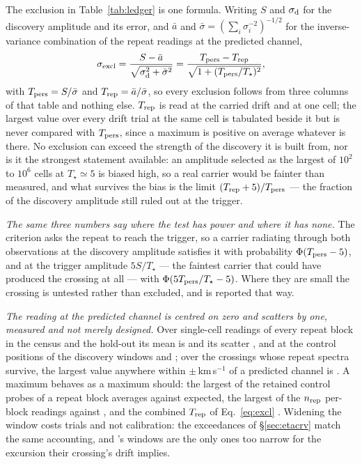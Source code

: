 The exclusion in Table~\ref{tab:ledger} is one formula. Writing $S$ and
$\sigma_{\rm d}$ for the discovery amplitude and its error, and $\bar{a}$ and
$\bar{\sigma}=(\sum_i\sigma_i^{-2})^{-1/2}$ for the inverse-variance
combination of the repeat readings at the predicted channel,
\begin{equation}
\sigma_{\rm excl}=\frac{S-\bar{a}}
{\sqrt{\sigma_{\rm d}^{2}+\bar{\sigma}^{2}}}
=\frac{T_{\rm pers}-T_{\rm rep}}{\sqrt{1+(T_{\rm pers}/T_\star)^{2}}},
\label{eq:excl}
\end{equation}
with $T_{\rm pers}=S/\bar{\sigma}$ and $T_{\rm rep}=\bar{a}/\bar{\sigma}$, so
every exclusion follows from three columns of that table and nothing else.
$T_{\rm rep}$ is read at the carried drift and at one cell; the largest value
over every drift trial at the same cell is tabulated beside it but is never
compared with $T_{\rm pers}$, since a maximum is positive on average whatever
is there. No exclusion can exceed the strength of the discovery it is built
from, nor is it the strongest statement available: an amplitude selected as
the largest of $10^{2}$ to $10^{6}$ cells at $T_\star\simeq5$ is biased high,
so a real carrier would be fainter than measured, and what survives the bias
is the limit $(T_{\rm rep}+5)/T_{\rm pers}$ --- the fraction of the discovery
amplitude still ruled out at the trigger.

\emph{The same three numbers say where the test has power and where it has
none.} The criterion asks the repeat to reach the trigger, so a carrier
radiating through both observations at the discovery amplitude satisfies it
with probability $\Phi(T_{\rm pers}-5)$, and at the trigger amplitude
$5S/T_\star$ --- the faintest carrier that could have produced the crossing
at all --- with $\Phi(5T_{\rm pers}/T_\star-5)$. Where they are small the
crossing is untested rather than excluded, and is reported that way.

\emph{The reading at the predicted channel is centred on zero and scatters
by one, measured and not merely designed.} Over \NuNullN{} single-cell
readings of every repeat block in the census and the hold-out its mean is
\NuNullMean{} and its scatter \NuNullSd, and at the control positions of the
discovery windows \NuDiscCtrlMean{} and \NuDiscCtrlSd; over the
\WdBandNCross{} crossings whose repeat spectra survive, the largest value
anywhere within $\pm$\WdBandKms\,km\,s$^{-1}$ of a predicted channel is
\WdBandMax. A maximum behaves as a maximum should: the largest of the
\NuCtrlRet{} retained control probes of a repeat block averages
\NuCtrlMean{} against \NuCtrlPred{} expected, the largest of the
$n_{\rm rep}$ per-block readings \NuColMean{} against \NuColPred, and the
combined $T_{\rm rep}$ of Eq.~\ref{eq:excl} \NuRepMean. Widening the window
costs trials and not calibration: the exceedances of \S\ref{sec:etacrv}
match the same accounting, and \WdOrbShortStar's windows are the only ones
too narrow for the excursion their crossing's drift implies.

